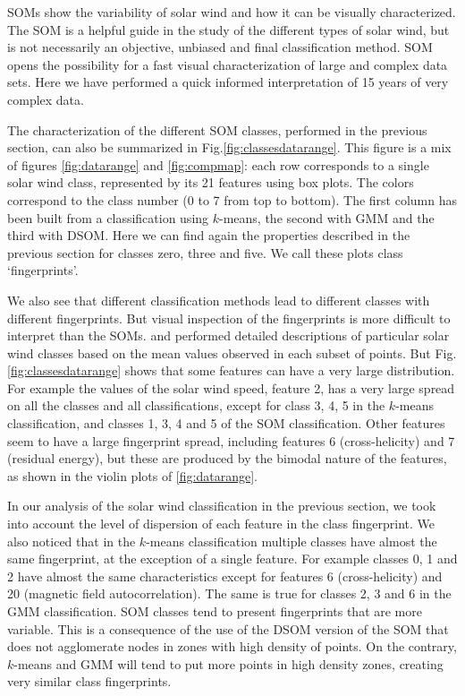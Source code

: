 SOMs show the variability of solar wind and how it can be visually characterized. The SOM is a helpful guide in the study of the different types of solar wind, but is not necessarily an objective, unbiased and final classification method. SOM opens the possibility for a fast visual characterization of large and complex data sets. Here we have performed a quick informed interpretation of 15 years of very complex data.

The characterization of the different SOM classes, performed in the previous section, can also be summarized in Fig.\ref{fig:classesdatarange}. This figure is a mix of figures \ref{fig:datarange} and \ref{fig:compmap}: each row corresponds to a single solar wind class, represented by its 21 features using box plots. The colors correspond to the class number (0 to 7 from top to bottom). The first column has been built from a classification using $k$-means, the second with GMM and the third with DSOM. Here we can find again the properties described in the previous section for classes zero, three and five. We call these plots class `fingerprints'.

We also see that different classification methods lead to different classes with different fingerprints. But visual inspection of the fingerprints is more difficult to interpret than the SOMs. \citep{Roberts2020} and \citep{Xu2015b} performed detailed descriptions of particular solar wind classes based on the mean values observed in each subset of points. But Fig.\ref{fig:classesdatarange} shows that some features can have a very large distribution. For example the values of the solar wind speed, feature 2, has a very large spread on all the classes and all classifications, except for class 3, 4, 5 in the $k$-means classification, and classes 1, 3, 4 and 5 of the SOM classification. Other features seem to have a large fingerprint spread, including features 6 (cross-helicity) and 7 (residual energy), but these are produced by the bimodal nature of the features, as shown in the violin plots of \ref{fig:datarange}.

In our analysis of the solar wind classification in the previous section, we took into account the level of dispersion of each feature in the class fingerprint. We also noticed that in the $k$-means classification multiple classes have almost the same fingerprint, at the exception of a single feature. For example classes 0, 1 and 2 have almost the same characteristics except for features 6 (cross-helicity) and 20 (magnetic field autocorrelation). The same is true for classes 2, 3 and 6 in the GMM classification. SOM classes tend to present fingerprints that are more variable. This is a consequence of the use of the DSOM version of the SOM that does not agglomerate nodes in zones with high density of points. On the contrary, $k$-means and GMM will tend to put more points in high density zones, creating very similar class fingerprints.


